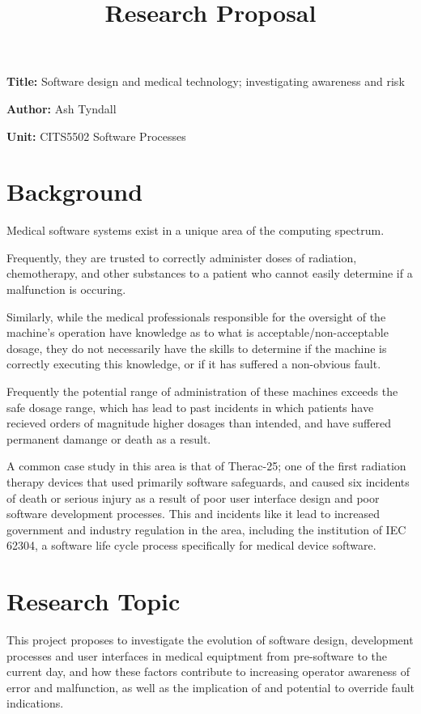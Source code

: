 \documentclass[12pt, a4paper]{article}
\title{Research Proposal}
\author{}
\date{}
\newcommand{\namelistlabel}[1]{\mbox{#1}\hfil}
\newenvironment{namelist}[1]{%
\begin{list}{}
    {
        \let\makelabel\namelistlabel
        \settowidth{\labelwidth}{#1}
        \setlength{\leftmargin}{1.1\labelwidth}
    }
  }{%
\end{list}}
\begin{document}
\maketitle

\begin{namelist}{xxxxxxxxxxxx}
\item[{\bf Title:}]
	Software design and medical technology; investigating awareness and risk
\item[{\bf Author:}]
	Ash Tyndall
\item[{\bf Unit:}]
	CITS5502 Software Processes
\end{namelist}

\section*{Background}
Medical software systems exist in a unique area of the computing spectrum.

Frequently, they are trusted to correctly administer doses of radiation, chemotherapy, and other substances to a patient who cannot easily determine if a malfunction is occuring.

Similarly, while the medical professionals responsible for the oversight of the machine's operation have knowledge as to what is acceptable/non-acceptable dosage, they do not necessarily have the skills to determine if the machine is correctly executing this knowledge, or if it has suffered a non-obvious fault.

Frequently the potential range of administration of these machines exceeds the safe dosage range, which has lead to past incidents in which patients have recieved orders of magnitude higher dosages than intended, and have suffered permanent damange or death as a result.

A common case study in this area is that of Therac-25; one of the first radiation therapy devices that used primarily software safeguards, and caused six incidents of death or serious injury as a result of poor user interface design and poor software development processes. \cite{leveson1993investigation} This and incidents like it lead to increased government and industry regulation in the area, including the institution of IEC 62304, a software life cycle process specifically for medical device software. \cite{jordan2006standard}


\section*{Research Topic} 
This project proposes to investigate the evolution of software design, development processes and user interfaces in medical equiptment from pre-software to the current day, and how these factors contribute to increasing operator awareness of error and malfunction, as well as the implication of and potential to override fault indications.
\end{document}
